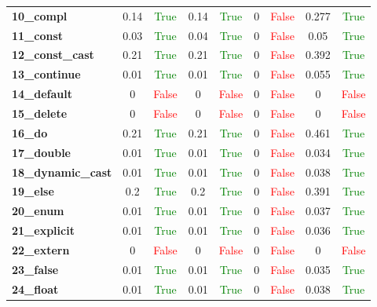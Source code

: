 \documentclass{article}
\begin{document}
\begin{xltabular}{\textwidth}{lcccccccc}
\textbf{10\_compl}& 0.14&\textcolor{green}{True}& 0.14&\textcolor{green}{True}& 0&\textcolor{red}{False}& 0.277&\textcolor{green}{True} \\[0.5ex]
\textbf{11\_const}& 0.03&\textcolor{green}{True}& 0.04&\textcolor{green}{True}& 0&\textcolor{red}{False}& 0.05&\textcolor{green}{True} \\[0.5ex]
\textbf{12\_const\_cast}& 0.21&\textcolor{green}{True}& 0.21&\textcolor{green}{True}& 0&\textcolor{red}{False}& 0.392&\textcolor{green}{True} \\[0.5ex]
\textbf{13\_continue}& 0.01&\textcolor{green}{True}& 0.01&\textcolor{green}{True}& 0&\textcolor{red}{False}& 0.055&\textcolor{green}{True} \\[0.5ex]
\textbf{14\_default}& 0&\textcolor{red}{False}& 0&\textcolor{red}{False}& 0&\textcolor{red}{False}& 0&\textcolor{red}{False} \\[0.5ex]
\textbf{15\_delete}& 0&\textcolor{red}{False}& 0&\textcolor{red}{False}& 0&\textcolor{red}{False}& 0&\textcolor{red}{False} \\[0.5ex]
\textbf{16\_do}& 0.21&\textcolor{green}{True}& 0.21&\textcolor{green}{True}& 0&\textcolor{red}{False}& 0.461&\textcolor{green}{True} \\[0.5ex]
\textbf{17\_double}& 0.01&\textcolor{green}{True}& 0.01&\textcolor{green}{True}& 0&\textcolor{red}{False}& 0.034&\textcolor{green}{True} \\[0.5ex]
\textbf{18\_dynamic\_cast}& 0.01&\textcolor{green}{True}& 0.01&\textcolor{green}{True}& 0&\textcolor{red}{False}& 0.038&\textcolor{green}{True} \\[0.5ex]
\textbf{19\_else}& 0.2&\textcolor{green}{True}& 0.2&\textcolor{green}{True}& 0&\textcolor{red}{False}& 0.391&\textcolor{green}{True} \\[0.5ex]
\textbf{20\_enum}& 0.01&\textcolor{green}{True}& 0.01&\textcolor{green}{True}& 0&\textcolor{red}{False}& 0.037&\textcolor{green}{True} \\[0.5ex]
\textbf{21\_explicit}& 0.01&\textcolor{green}{True}& 0.01&\textcolor{green}{True}& 0&\textcolor{red}{False}& 0.036&\textcolor{green}{True} \\[0.5ex]
\textbf{22\_extern}& 0&\textcolor{red}{False}& 0&\textcolor{red}{False}& 0&\textcolor{red}{False}& 0&\textcolor{red}{False} \\[0.5ex]
\textbf{23\_false}& 0.01&\textcolor{green}{True}& 0.01&\textcolor{green}{True}& 0&\textcolor{red}{False}& 0.035&\textcolor{green}{True} \\[0.5ex]
\textbf{24\_float}& 0.01&\textcolor{green}{True}& 0.01&\textcolor{green}{True}& 0&\textcolor{red}{False}& 0.038&\textcolor{green}{True} \\[0.5ex]

\end{xltabular}
\end{document}
